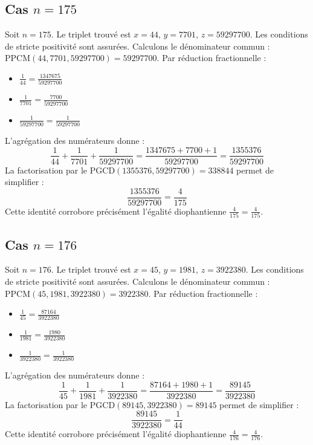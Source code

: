 \documentclass[11pt,a4paper]{article}
\begin{document}
\subsection{Cas $n = 175$}
Soit $n = 175$. Le triplet trouvé est $x = 44$, $y = 7701$, $z = 59297700$.
Les conditions de stricte positivité sont assurées.
Calculons le dénominateur commun : $\text{PPCM}(44, 7701, 59297700) = 59297700$.
Par réduction fractionnelle :
\begin{itemize}
    \item $\frac{1}{44} = \frac{1347675}{59297700}$
    \item $\frac{1}{7701} = \frac{7700}{59297700}$
    \item $\frac{1}{59297700} = \frac{1}{59297700}$
\end{itemize}
L'agrégation des numérateurs donne :
$$ \frac{1}{44} + \frac{1}{7701} + \frac{1}{59297700} = \frac{1347675 + 7700 + 1}{59297700} = \frac{1355376}{59297700} $$
La factorisation par le $\text{PGCD}(1355376, 59297700) = 338844$ permet de simplifier :
$$ \frac{1355376}{59297700} = \frac{4}{175} $$
Cette identité corrobore précisément l'égalité diophantienne $\frac{4}{175} = \frac{4}{175}$.

\subsection{Cas $n = 176$}
Soit $n = 176$. Le triplet trouvé est $x = 45$, $y = 1981$, $z = 3922380$.
Les conditions de stricte positivité sont assurées.
Calculons le dénominateur commun : $\text{PPCM}(45, 1981, 3922380) = 3922380$.
Par réduction fractionnelle :
\begin{itemize}
    \item $\frac{1}{45} = \frac{87164}{3922380}$
    \item $\frac{1}{1981} = \frac{1980}{3922380}$
    \item $\frac{1}{3922380} = \frac{1}{3922380}$
\end{itemize}
L'agrégation des numérateurs donne :
$$ \frac{1}{45} + \frac{1}{1981} + \frac{1}{3922380} = \frac{87164 + 1980 + 1}{3922380} = \frac{89145}{3922380} $$
La factorisation par le $\text{PGCD}(89145, 3922380) = 89145$ permet de simplifier :
$$ \frac{89145}{3922380} = \frac{1}{44} $$
Cette identité corrobore précisément l'égalité diophantienne $\frac{4}{176} = \frac{4}{176}$.
\end{document}
